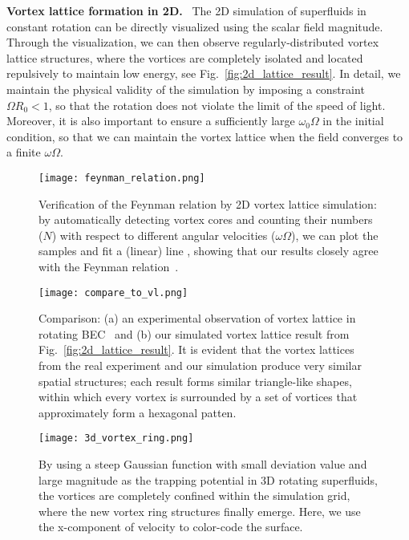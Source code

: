 \documentclass[10pt,journal,compsoc,twoside]{IEEEtran}
\newcommand{\bl}[1]{{\color{black}{#1}}}
\begin{document}
	\vspace{0.15cm}
	\noindent
	\textbf{Vortex lattice formation in 2D.} \
	The 2D simulation of superfluids in constant rotation can be directly visualized using the scalar field magnitude.
	Through the visualization, we can then observe regularly-distributed vortex lattice structures, where the vortices are completely isolated and located repulsively to maintain low energy, see Fig.~\ref{fig:2d_lattice_result}.
	In detail, we maintain the physical validity of the simulation by imposing a constraint $\Omega R_0 <1$, so that the rotation does not violate the limit of the speed of light.
	Moreover, it is also important to ensure a sufficiently large $\omega_0 \Omega$ in the initial condition, so that we can maintain the vortex lattice when the field converges to a finite $\omega \Omega$.
	
	\begin{figure}[!t]
		\centering
		\texttt{[image: feynman\_relation.png]}
		\caption{Verification of the Feynman relation by 2D vortex lattice simulation: by automatically detecting vortex cores and counting their numbers ($N$) with respect to different angular velocities ($\omega \Omega$), we can plot the samples and fit a (linear) line \bl{in the least square sense}, showing that our results closely agree with the Feynman relation~\cite{Feynman-55}.}
		\label{fig:feynman_relation}
	\end{figure}
	
	\begin{figure}[!t]
		\centering
		\texttt{[image: compare\_to\_vl.png]}
		\caption{Comparison: (a) an experimental observation of vortex lattice in rotating BEC~\cite{Abo-Shaeer_01} and (b) our simulated vortex lattice result from Fig.~\ref{fig:2d_lattice_result}.
		It is evident that the vortex lattices from the real experiment and our simulation produce very similar spatial structures; each result forms similar triangle-like shapes, within which every vortex is surrounded by a set of vortices that approximately form a hexagonal patten.}
		\label{fig:compare_to_vl}
		\vspace*{-5mm}
	\end{figure}
	
	\begin{figure}[!t]
		\centering
		\texttt{[image: 3d\_vortex\_ring.png]}
		\caption{By using a steep Gaussian function with small deviation value and large magnitude as the trapping potential in 3D rotating superfluids, the vortices are completely confined within the simulation grid, where the new vortex ring structures finally emerge.
		Here, we use the x-component of velocity to color-code the surface.}
		\label{fig:3d_vortex_ring}
	\end{figure}
	
\end{document}
